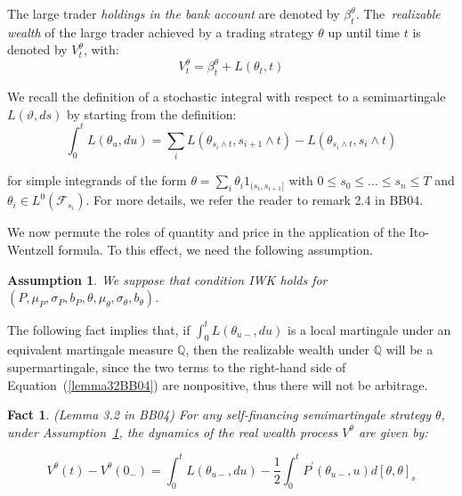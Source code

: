 \documentclass{article}
\newtheorem{assumption}[theorem]{Assumption}
\newtheorem{fact}[theorem]{Fact}
\begin{document}
The large trader \textit{holdings in the bank account} are denoted by $\beta
_{t}^{\theta }$. The\textit{\ realizable wealth} of the large trader
achieved by a trading strategy $\theta $ up until time $t$ is denoted by $%
V_{t}^{\theta }$, with:%
\begin{equation*}
V_{t}^{\theta }=\beta _{t}^{\theta }+L(\theta _{t},t)
\end{equation*}

We recall the definition of a stochastic integral with respect to a
semimartingale $L(\vartheta ,ds)$ by starting from the definition:%
\begin{equation*}
\int_{0}^{t}L(\theta _{u},du)=\sum_{i}L(\theta _{s_{i}\wedge
t},s_{i+1}\wedge t)-L(\theta _{s_{i}\wedge t},s_{i}\wedge t)
\end{equation*}

for simple integrands of the form $\theta =\sum_{i}\theta
_{i}1_{(s_{i},s_{i+1}]}$ with $0\leq s_{0}\leq ...\leq s_{n}\leq T$ and $%
\theta _{i}\in L^{0}(\mathcal{F}_{s_{i}})$. For more details, we refer the
reader to remark 2.4 in BB04.

\bigskip

We now permute the roles of quantity and price in the application of the
Ito-Wentzell formula. To this effect, we need the following assumption.


\begin{assumption} \label{ass::iwk_condition_P}
We suppose that condition IWK holds for $(P,\mu _{P},\sigma
_{P},b_{P},\theta ,\mu _{\theta },\sigma _{\theta },b_{\theta })$.\bigskip
\end{assumption}

The following fact implies that, if $\int_{0}^{t}L(\theta _{u-},du)$ is a
local martingale under an equivalent martingale measure $\mathbb{Q}$, then
the realizable wealth under $\mathbb{Q}$ will be a supermartingale, since
the two terms to the right-hand side of Equation~(\ref{lemma32BB04}) are
nonpositive, thus there will not be arbitrage.


\begin{fact}
(Lemma 3.2 in BB04) For any self-financing semimartingale
strategy $\theta $, under Assumption~\ref{ass::iwk_condition_P}, the dynamics of the real wealth
process $V^{\theta }$ are given by:
\end{fact}

\begin{equation}
V^{\theta }(t)-V^{\theta }(0_{-})=\int_{0}^{t}L(\theta _{u-},du)-\frac{1}{2}%
\int_{0}^{t}P^{\prime }(\theta _{u-},u)d[\theta ,\theta ]_{s}
\label{lemma32BB04}
\end{equation}%
\bigskip
\end{document}
